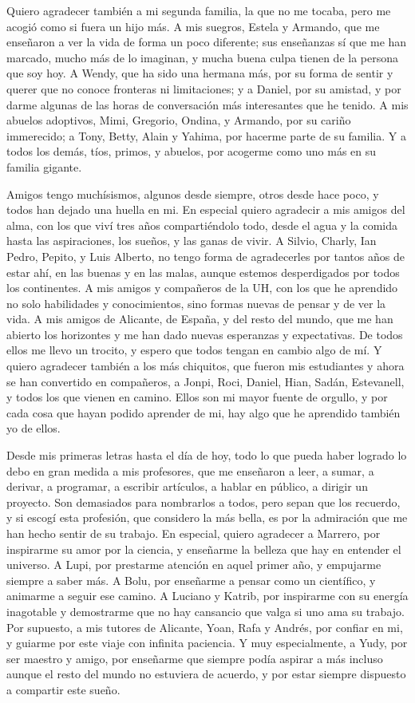 Quiero agradecer también a mi segunda familia, la que no me tocaba, pero me acogió como si fuera un hijo más.
A mis suegros, Estela y Armando, que me enseñaron a ver la vida de forma un poco diferente; sus enseñanzas sí que me han marcado, mucho más de lo imaginan, y mucha buena culpa tienen de la persona que soy hoy.
A Wendy, que ha sido una hermana más, por su forma de sentir y querer que no conoce fronteras ni limitaciones; y a Daniel, por su amistad, y por darme algunas de las horas de conversación más interesantes que he tenido.
A mis abuelos adoptivos, Mimi, Gregorio, Ondina, y Armando, por su cariño immerecido; a Tony, Betty, Alain y Yahima, por hacerme parte de su familia.
Y a todos los demás, tíos, primos, y abuelos, por acogerme como uno más en su familia gigante.

Amigos tengo muchísismos, algunos desde siempre, otros desde hace poco, y todos han dejado una huella en mi.
En especial quiero agradecir a mis amigos del alma, con los que viví tres años compartiéndolo todo, desde el agua y la comida hasta las aspiraciones, los sueños, y las ganas de vivir.
A Silvio, Charly, Ian Pedro, Pepito, y Luis Alberto, no tengo forma de agradecerles por tantos años de estar ahí, en las buenas y en las malas, aunque estemos desperdigados por todos los continentes.
A mis amigos y compañeros de la UH, con los que he aprendido no solo habilidades y conocimientos, sino formas nuevas de pensar y de ver la vida.
A mis amigos de Alicante, de España, y del resto del mundo, que me han abierto los horizontes y me han dado nuevas esperanzas y expectativas.
De todos ellos me llevo un trocito, y espero que todos tengan en cambio algo de mí.
Y quiero agradecer también a los más chiquitos, que fueron mis estudiantes y ahora se han convertido en compañeros, a Jonpi, Roci, Daniel, Hian, Sadán, Estevanell, y todos los que vienen en camino.
Ellos son mi mayor fuente de orgullo, y por cada cosa que hayan podido aprender de mi, hay algo que he aprendido también yo de ellos.

Desde mis primeras letras hasta el día de hoy, todo lo que pueda haber logrado lo debo en gran medida a mis profesores, que me enseñaron a leer, a sumar, a derivar, a programar, a escribir artículos, a hablar en público, a dirigir un proyecto.
Son demasiados para nombrarlos a todos, pero sepan que los recuerdo, y si escogí esta profesión, que considero la más bella, es por la admiración que me han hecho sentir de su trabajo.
En especial, quiero agradecer a Marrero, por inspirarme su amor por la ciencia, y enseñarme la belleza que hay en entender el universo.
A Lupi, por prestarme atención en aquel primer año, y empujarme siempre a saber más.
A Bolu, por enseñarme a pensar como un científico, y animarme a seguir ese camino.
A Luciano y Katrib, por inspirarme con su energía inagotable y demostrarme que no hay cansancio que valga si uno ama su trabajo.
Por supuesto, a mis tutores de Alicante, Yoan, Rafa y Andrés, por confiar en mi, y guiarme por este viaje con infinita paciencia.
Y muy especialmente, a Yudy, por ser maestro y amigo, por enseñarme que siempre podía aspirar a más incluso aunque el resto del mundo no estuviera de acuerdo, y por estar siempre dispuesto a compartir este sueño.

